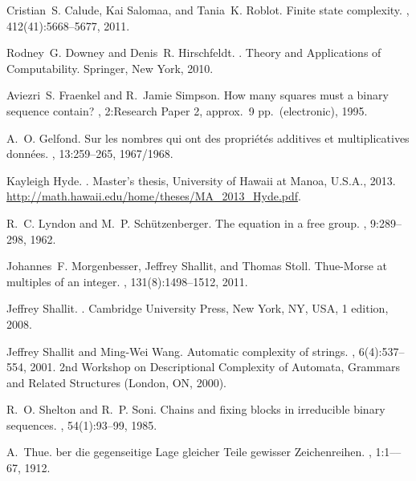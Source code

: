 \documentclass[12pt]{article}
\theoremstyle{plain}
\theoremstyle{definition}
\theoremstyle{remark}
\begin{document}
	\begin{thebibliography}{10}

	Cristian~S. Calude, Kai Salomaa, and Tania~K. Roblot.
	\newblock Finite state complexity.
	, 412(41):5668--5677, 2011.

	Rodney~G. Downey and Denis~R. Hirschfeldt.
	.
	\newblock Theory and Applications of Computability. Springer, New York, 2010.

	Aviezri~S. Fraenkel and R.~Jamie Simpson.
	\newblock How many squares must a binary sequence contain?
	, 2:Research Paper 2, approx.\ 9 pp.\
	  (electronic), 1995.

	A.~O. Gelfond.
	\newblock Sur les nombres qui ont des propri\'et\'es additives et
	  multiplicatives donn\'ees.
	, 13:259--265, 1967/1968.

	Kayleigh Hyde.
	.
	\newblock Master's thesis, University of Hawaii at Manoa, U.S.A., 2013.
	\newblock \url{http://math.hawaii.edu/home/theses/MA_2013_Hyde.pdf}.

	R.~C. Lyndon and M.~P. Sch{\"u}tzenberger.
	\newblock The equation {} in a free group.
	, 9:289--298, 1962.

	Johannes~F. Morgenbesser, Jeffrey Shallit, and Thomas Stoll.
	\newblock Thue-{M}orse at multiples of an integer.
	, 131(8):1498--1512, 2011.

	Jeffrey Shallit.
	.
	\newblock Cambridge University Press, New York, NY, USA, 1 edition, 2008.

	Jeffrey Shallit and Ming-Wei Wang.
	\newblock Automatic complexity of strings.
	, 6(4):537--554, 2001.
	\newblock 2nd Workshop on Descriptional Complexity of Automata, Grammars and
	  Related Structures (London, ON, 2000).

	R.~O. Shelton and R.~P. Soni.
	\newblock Chains and fixing blocks in irreducible binary sequences.
	\newblock {\em Discrete Math.}, 54(1):93--99, 1985.

	A.~Thue.
	ber die gegenseitige {L}age gleicher {T}eile gewisser
	  {Z}eichenreihen.
	, 1:1--–67,
	  1912.

	\end{thebibliography}
\end{document}
